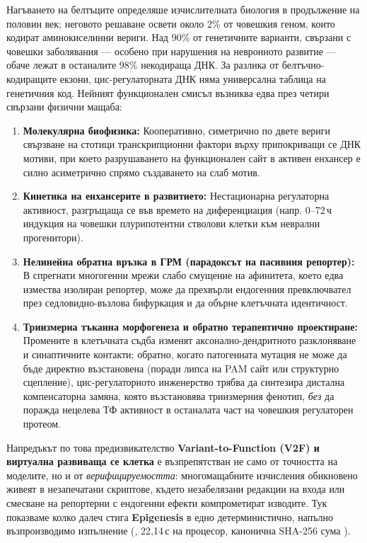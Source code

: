 \documentclass[10.5pt,a4paper]{article}
\begin{document}
Нагъването на белтъците определяше изчислителната биология в продължение на половин век; неговото решаване освети около 2\% от човешкия геном, които кодират аминокиселинни вериги. Над 90\% от генетичните варианти, свързани с човешки заболявания — особено при нарушения на невронното развитие — обаче лежат в останалите 98\% некодираща ДНК. За разлика от белтъчно-кодиращите екзони, цис-регулаторната ДНК няма универсална таблица на генетичния код. Нейният функционален смисъл възниква едва през четири свързани физични мащаба:
\begin{enumerate}
\item \textbf{Молекулярна биофизика:} Кооперативно, симетрично по двете вериги свързване на стотици транскрипционни фактори върху припокриващи се ДНК мотиви, при което разрушаването на функционален сайт в активен енхансер е силно асиметрично спрямо създаването на слаб мотив.
\item \textbf{Кинетика на енхансерите в развитието:} Нестационарна регулаторна активност, разгръщаща се във времето на диференциация (напр. 0--72\,ч индукция на човешки плурипотентни стволови клетки към неврални прогенитори).
\item \textbf{Нелинейна обратна връзка в ГРМ (парадоксът на пасивния репортер):} В спрегнати многогенни мрежи слабо смущение на афинитета, което едва измества изолиран репортер, може да прехвърли ендогенния превключвател през седловидно-възлова бифуркация и да обърне клетъчната идентичност.
\item \textbf{Триизмерна тъканна морфогенеза и обратно терапевтично проектиране:} Промените в клетъчната съдба изменят аксонално-дендритното разклоняване и синаптичните контакти; обратно, когато патогенната мутация не може да бъде директно възстановена (поради липса на PAM сайт или структурно сцепление), цис-регулаторното инженерство трябва да синтезира дистална компенсаторна замяна, която възстановява триизмерния фенотип, \emph{без} да поражда нецелева ТФ активност в останалата част на човешкия регулаторен протеом.
\end{enumerate}

Напредъкът по това предизвикателство \textbf{Variant-to-Function (V2F) и виртуална развиваща се клетка} е възпрепятстван не само от точността на моделите, но и от \emph{верифицируемостта}: многомащабните изчисления обикновено живеят в незапечатани скриптове, където незабелязани редакции на входа или смесване на репортерни с ендогенни ефекти компрометират изводите. Тук показваме колко далеч стига \textbf{Epigenesis} в едно детерминистично, напълно възпроизводимо изпълнение (, 22,14\,с на процесор, канонична SHA-256 сума ).
\end{document}
